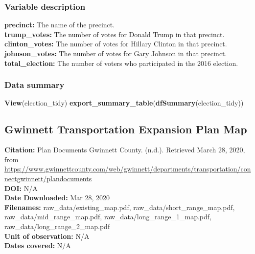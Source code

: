 \documentclass[
]{article}
\newenvironment{Shaded}{\begin{snugshade}}{\end{snugshade}}
\newcommand{\KeywordTok}[1]{\textcolor[rgb]{0.13,0.29,0.53}{\textbf{#1}}}
\newcommand{\NormalTok}[1]{#1}
\begin{document}
\hypertarget{variable-description}{%
\subsubsection{Variable description}\label{variable-description}}

\textbf{precinct:} The name of the precinct.\\
\textbf{trump\_votes:} The number of votes for Donald Trump in that
precinct.\\
\textbf{clinton\_votes:} The number of votes for Hillary Clinton in that
precinct.\\
\textbf{johnson\_votes:} The number of votes for Gary Johnson in that
precinct. \textbf{total\_election:} The number of voters who
participated in the 2016 election.

\hypertarget{data-summary-1}{%
\subsubsection{Data summary}\label{data-summary-1}}

\begin{Shaded}
\begin{Highlighting}[]
\KeywordTok{View}\NormalTok{(election_tidy)}
\KeywordTok{export_summary_table}\NormalTok{(}\KeywordTok{dfSummary}\NormalTok{(election_tidy))}
\end{Highlighting}
\end{Shaded}

\hypertarget{gwinnett-transportation-expansion-plan-map}{%
\subsection{Gwinnett Transportation Expansion Plan
Map}\label{gwinnett-transportation-expansion-plan-map}}

\textbf{Citation:} Plan Documents \textbar{} Gwinnett County. (n.d.).
Retrieved March 28, 2020, from
\url{https://www.gwinnettcounty.com/web/gwinnett/departments/transportation/connectgwinnett/plandocuments}\\
\textbf{DOI:} N/A\\
\textbf{Date Downloaded:} Mar 28, 2020\\
\textbf{Filenames:} raw\_data/existing\_map.pdf,
raw\_data/short\_range\_map.pdf, raw\_data/mid\_range\_map.pdf,
raw\_data/long\_range\_1\_map.pdf, raw\_data/long\_range\_2\_map.pdf\\
\textbf{Unit of observation:} N/A\\
\textbf{Dates covered:} N/A
\end{document}
